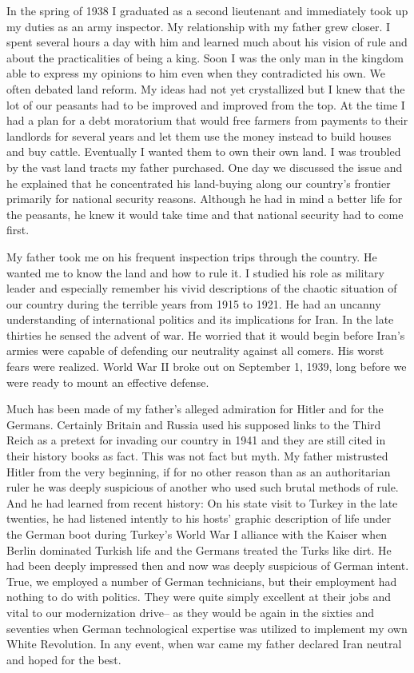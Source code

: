 In the spring of 1938 I graduated as a second lieutenant and immediately took up my duties as an army inspector. My relationship with my father grew closer. I spent several hours a day with him and learned much about his vision of rule and about the practicalities of being a king. Soon I was the only man in the kingdom able to express my opinions to him even when they contradicted his own. We often debated land reform. My ideas had not yet crystallized but I knew that the lot of our peasants had to be improved and improved from the top. At the time I had a plan for a debt moratorium that would free farmers from payments to their landlords for several years and let them use the money instead to build houses and buy cattle. Eventually I wanted them to own their own land. I was troubled by the vast land tracts my father purchased. One day we discussed the issue and he explained that he concentrated his land-buying along our country’s frontier primarily for national security reasons. Although he had in mind a better life for the peasants, he knew it would take time and that national security had to come first. 

My father took me on his frequent inspection trips through the country. He wanted me to know the land and how to rule it. I studied his role as military leader and especially remember his vivid descriptions of the chaotic situation of our country during the terrible years from 1915 to 1921. He had an uncanny understanding of international politics and its implications for Iran. In the late thirties he sensed the advent of war. He worried that it would begin before Iran's armies were capable of defending our neutrality against all comers. His worst fears were realized. World War II broke out on September 1, 1939, long before we were ready to mount an effective defense. 


Much has been made of my father’s alleged admiration for Hitler and for the Germans. Certainly Britain and Russia used his supposed links to the Third Reich as a pretext for invading our country in 1941 and they are still cited in their history books as fact. This was not fact but myth. My father mistrusted Hitler from the very beginning, if for no other reason than as an authoritarian ruler he was deeply suspicious of another who used such brutal methods of rule. And he had learned from recent history: On his state visit to Turkey in the late twenties, he had listened intently to his hosts’ graphic description of life under the German boot during Turkey's World War I alliance with the Kaiser when Berlin dominated Turkish life and the Germans treated the Turks like dirt. He had been deeply impressed then and now was deeply suspicious of German intent. True, we employed a number of German technicians, but their employment had nothing to do with politics. They were quite simply excellent at their jobs and vital to our modernization drive-- as they would be again in the sixties and seventies when German technological expertise was utilized to implement my own White Revolution. In any event, when war came my father declared Iran neutral and hoped for the best. 

